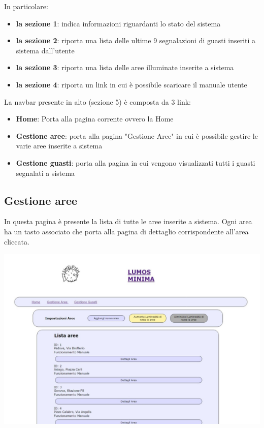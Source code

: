 \documentclass[9pt]{article}
\begin{document}
In particolare:
\begin{itemize}
	\item \textbf{la sezione 1}: indica informazioni riguardanti lo stato del sistema
	\item \textbf{la sezione 2}: riporta una lista delle ultime 9 segnalazioni di guasti inseriti a sistema dall'utente
	\item \textbf{la sezione 3}: riporta una lista delle aree illuminate inserite a sistema
	\item \textbf{la sezione 4}: riporta un link in cui è possibile scaricare il manuale utente\\
\end{itemize}

La navbar presente in alto (sezione 5) è composta da 3 link:

\begin{itemize}
	\item \textbf{Home}: Porta alla pagina corrente ovvero la Home
	\item \textbf{Gestione aree}: porta alla pagina "Gestione Aree" in cui è possibile gestire le varie aree inserite a sistema
	\item \textbf{Gestione guasti}: porta alla pagina in cui vengono visualizzati tutti i guasti segnalati a sistema
\end{itemize}

\subsection{Gestione aree}
In questa pagina è presente la lista di tutte le aree inserite a sistema.
Ogni area ha un tasto associato che porta alla pagina di dettaglio corrispondente all'area cliccata.

\begin{center}
	\includegraphics[scale=0.3]{Gestione_aree.png}
\end{center}
\end{document}
